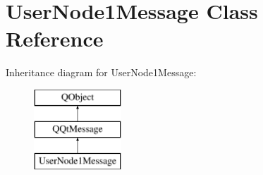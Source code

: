 \hypertarget{class_user_node1_message}{}\section{User\+Node1\+Message Class Reference}
\label{class_user_node1_message}
Inheritance diagram for User\+Node1\+Message\+:\begin{figure}[H]
\begin{center}
\leavevmode
\includegraphics[height=3.000000cm]{class_user_node1_message}
\end{center}
\end{figure}
